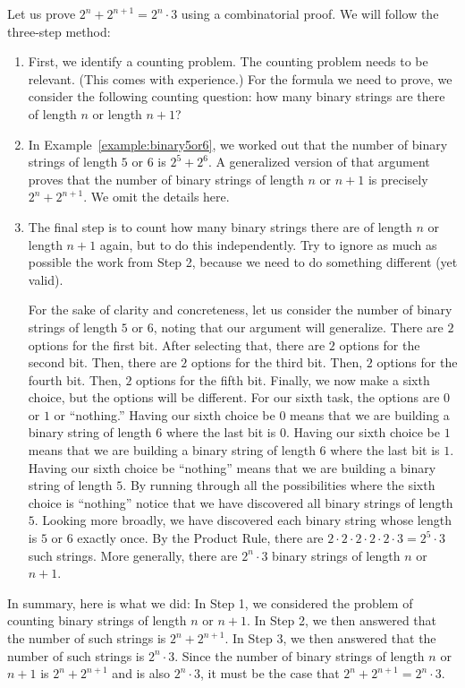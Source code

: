 \documentclass{book}
\theoremstyle{ekimcustom}
\begin{document}
Let us prove $2^n+2^{n+1} = 2^n \cdot 3$ using a combinatorial proof. We will follow the three-step method:
\begin{enumerate}
\item First, we identify a counting problem. The counting problem needs to be relevant. (This comes with experience.) For the formula we need to prove, we consider the following counting question: how many binary strings are there of length $n$ or length $n+1$?
\item In Example~\ref{example:binary5or6}, we worked out that the number of binary strings of length $5$ or $6$ is $2^5+2^6$. A generalized version of that argument proves that the number of binary strings of length $n$ or $n+1$ is precisely $2^n+2^{n+1}$. We omit the details here.
\item The final step is to count how many binary strings there are of length $n$ or length $n+1$ again, but to do this independently. Try to ignore as much as possible the work from Step 2, because we need to do something different (yet valid).

For the sake of clarity and concreteness, let us consider the number of binary strings of length $5$ or $6$, noting that our argument will generalize. There are $2$ options for the first bit. After selecting that, there are $2$ options for the second bit. Then, there are $2$ options for the third bit. Then, $2$ options for the fourth bit. Then, $2$ options for the fifth bit. Finally, we now make a sixth choice, but the options will be different. For our sixth task, the options are $0$ or $1$ or ``nothing.'' Having our sixth choice be $0$ means that we are building a binary string of length $6$ where the last bit is $0$. Having our sixth choice be $1$ means that we are building a binary string of length $6$ where the last bit is $1$. Having our sixth choice be ``nothing'' means that we are building a binary string of length $5$. By running through all the possibilities where the sixth choice is ``nothing'' notice that we have discovered all binary strings of length $5$. Looking more broadly, we have discovered each binary string whose length is $5$ or $6$ exactly once. By the Product Rule, there are $2 \cdot 2 \cdot 2 \cdot 2 \cdot 2 \cdot 3 = 2^5 \cdot 3$ such strings. More generally, there are $2^n \cdot 3$ binary strings of length $n$ or $n+1$.
\end{enumerate}
In summary, here is what we did: In Step 1, we considered the problem of counting binary strings of length $n$ or $n+1$. In Step 2, we then answered that the number of such strings is $2^n+2^{n+1}$. In Step 3, we then answered that the number of such strings is $2^n \cdot 3$. Since the number of binary strings of length $n$ or $n+1$ is $2^n+2^{n+1}$ and is also $2^n \cdot 3$, it must be the case that $2^n+2^{n+1}=2^n \cdot 3$.
\end{document}
